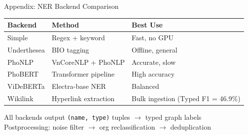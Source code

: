 \documentclass[aspectratio=169]{beamer}
\newcommand{\HL}[1]{\textcolor{emphasis}{#1}}
\newcommand{\backupend}{%
  \addtocounter{framenumberappendix}{-\value{framenumber}}%
  \addtocounter{framenumber}{\value{framenumberappendix}}%
}
\begin{document}
\begin{frame}{Appendix: NER Backend Comparison}
\begin{center}
\begin{tabular}{lll}
\toprule
\textbf{Backend} & \textbf{Method} & \textbf{Best Use} \\
\midrule
Simple & Regex + keyword & Fast, no GPU \\
Underthesea & BIO tagging & Offline, general \\
PhoNLP & VnCoreNLP + PhoNLP & Accurate, slow \\
PhoBERT & Transformer pipeline & High accuracy \\
ViDeBERTa & Electra-base NER & Balanced \\
\HL{Wikilink} & Hyperlink extraction & \HL{Bulk ingestion (Typed F1 = 46.9\%)} \\
\bottomrule
\end{tabular}
\end{center}
\vspace{0.4em}
All backends output \texttt{(name, type)} tuples $\rightarrow$ typed graph labels\\
Postprocessing: noise filter $\rightarrow$ org reclassification $\rightarrow$ deduplication
\end{frame}

\backupend
\end{document}
